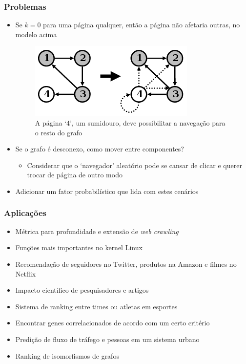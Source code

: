 \documentclass{beamer}
\begin{document}
\begin{frame}
    \frametitle{Problemas}
    \begin{itemize}
        \item Se $k = 0$ para uma página qualquer,
        então a página não afetaria outras, no modelo acima
        \begin{figure}
            \includegraphics[scale=0.35]{pr_2}
            \caption{\tiny{A página `4', um sumidouro, deve possibilitar a
            navegação para o resto do grafo}}
        \end{figure}
        \item Se o grafo é desconexo, como mover entre componentes?
        \begin{itemize}
            \item Considerar que o `navegador' aleatório pode se cansar de
            clicar e querer trocar de página de outro modo
        \end{itemize}
        \item Adicionar um fator probabilístico que lida com estes cenários
    \end{itemize}
\end{frame}

\begin{frame}
    \frametitle{Aplicações}
    \begin{itemize}
        \item Métrica para profundidade e extensão de \textit{web crawling}
        \item Funções mais importantes no kernel Linux
        \item Recomendação de seguidores no Twitter, produtos na Amazon e
        filmes no Netflix
        \item Impacto científico de pesquisadores e artigos
        \item Sistema de ranking entre times ou atletas em esportes
        \item Encontrar genes correlacionados de acordo com um certo critério
        \item Predição de fluxo de tráfego e pessoas em um sistema urbano
        \item Ranking de isomorfismos de grafos
    \end{itemize}
\end{frame}
\end{document}
